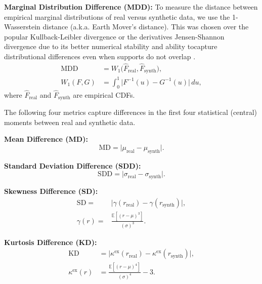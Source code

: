 \documentclass[sigconf]{acmart}
\begin{document}
      \begin{enumerate}[label=\textbf{[M\arabic*]}]
        \item \label{metric:mdd} \textbf{Marginal Distribution 
        Difference (MDD):}  
        To measure the distance between empirical marginal distributions
        of real versus synthetic data, we use the 1-Wasserstein distance
        (a.k.a. Earth Mover's distance). This was chosen over the 
        popular Kullback-Leibler divergence or the derivatives
        Jensen-Shannon divergence due to its better numerical stability
        and ability tocapture distributional differences even when
        supports do not overlap \cite{Arjovsky17}.
        \[
        \begin{aligned}
          \mathrm{MDD} &= W_1\big(\widehat{F}_{\text{real}}, 
          \widehat{F}_{\text{synth}}\big), \\
          W_1(F, G) &= \int_0^1 \big|F^{-1}(u) - G^{-1}(u)\big|\,du,
          \end{aligned}
          \]
          where \(\widehat{F}_{\text{real}}\) and \(\widehat{F}_{\text{synth}}\) 
          are empirical CDFs.
          
          \end{enumerate}
          The following four metrics capture differences in the first four
          statistical (central) moments between real and synthetic data.
          \begin{enumerate}[label=\textbf{[M\arabic*]}, resume]
          
          \item \label{metric:md} \textbf{Mean Difference (MD):}  
          \[
          \mathrm{MD} = \big|\mu_{\text{real}} - \mu_{\text{synth}}\big|.
          \]
          
          \item \label{metric:sdd} \textbf{Standard Deviation Difference (SDD):}  
          \[
          \mathrm{SDD} = \big|\sigma_{\text{real}} - \sigma_{\text{synth}}\big|.
          \]

          \item \label{metric:skewness} \textbf{Skewness Difference (SD):}  
          \begin{align*}
          \mathrm{SD} =& \big|\gamma(r_{\text{real}}) - \gamma(r_{\text{synth}})\big|, \\
          \gamma(r) =& \frac{\mathbb{E}[(r - \mu)^3]}{(\sigma)^3}.
          \end{align*}
          
          \item \label{metric:kd} \textbf{Kurtosis Difference (KD):}  
          \begin{align*}
          \mathrm{KD} &= \big|\kappa^{\mathrm{ex}}(r_{\text{real}}) 
          - \kappa^{\mathrm{ex}}(r_{\text{synth}})\big|, \\
          \kappa^{\mathrm{ex}}(r) &= \frac{\mathbb{E}[(r - \mu)^4]}{(\sigma)^4} - 3.
          \end{align*}
          
          \end{enumerate}
          
\end{document}
